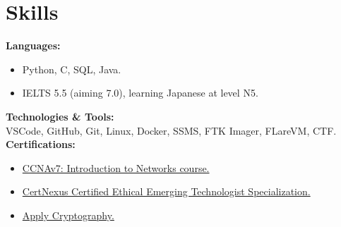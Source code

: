 \documentclass[a4paper,8pt]{article}
\begin{document}
\section{Skills}
\color[HTML]{1C033C}\textbf{Languages:} \\[2pt]
\begin{minipage}[t]{\linewidth}
    \begin{itemize}[nosep,after=\strut, leftmargin=2em, itemsep=2pt]
        \item  Python, C, SQL, Java.
        \item  IELTS 5.5 (aiming 7.0), learning Japanese at level N5.
    \end{itemize}
    \end{minipage}
  \color[HTML]{1C033C}\textbf{Technologies \& Tools:} \\[2pt]
\color[HTML]{1C033C} \hspace*{4ex} VSCode, GitHub, Git, Linux, Docker, SSMS, FTK Imager, FLareVM, CTF.\\[3pt]
\color[HTML]{1C033C}\textbf{Certifications:} \\[2pt]
\begin{minipage}[t]{\linewidth}
    \begin{itemize}[nosep,after=\strut, leftmargin=2em, itemsep=2pt]
        \item \href{https://drive.google.com/file/d/1fpAl0AC2Qd3WKSSsyjSBGrmFZdM8cfYv/view?usp=sharing}{CCNAv7: Introduction to Networks course.}
        \item \href{https://www.coursera.org/account/accomplishments/specialization/certificate/YRACKWMQT2L5}{CertNexus Certified Ethical Emerging Technologist Specialization.}
        \item \href{https://www.coursera.org/account/accomplishments/specialization/certificate/VAWFYY52JB5R}{Apply Cryptography. }
    \end{itemize}
    \end{minipage}
\end{document}
